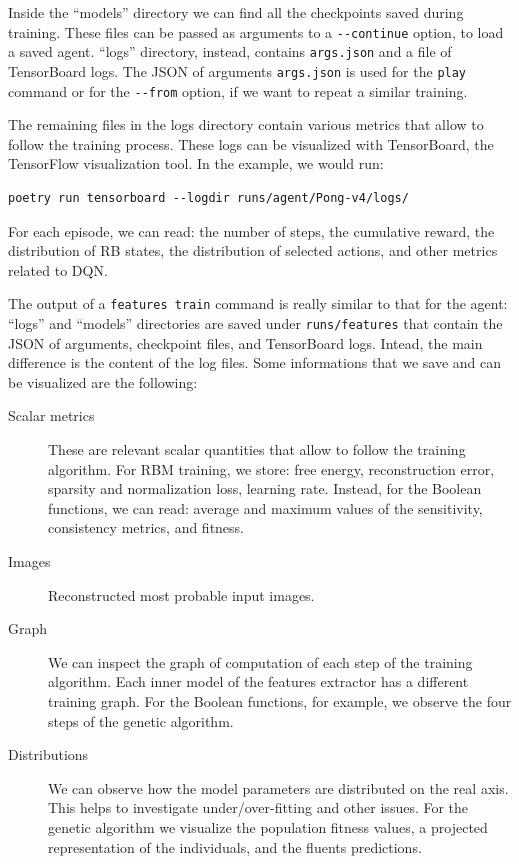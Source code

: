 Inside the ``models'' directory we can find all the checkpoints saved
during training. These files can be passed as arguments to a \verb|--continue|
option, to load a saved agent. ``logs'' directory, instead, contains
\verb|args.json| and a file of TensorBoard logs. The JSON of arguments
\verb|args.json| is used for the \texttt{play} command or for the
\verb|--from| option, if we want to repeat a similar training.

The remaining files in the logs directory contain various metrics that allow
to follow the training process. These logs can be visualized with TensorBoard,
the TensorFlow visualization tool. In the example, we would run:
\begin{verbatim}
poetry run tensorboard --logdir runs/agent/Pong-v4/logs/
\end{verbatim}
For each episode, we can read: the number of steps, the cumulative reward, the
distribution of RB states, the distribution of selected actions, and other
metrics related to DQN.

The output of a \texttt{features train} command is really similar to that for
the agent: ``logs'' and ``models'' directories are saved under
\verb|runs/features| that contain the JSON of arguments, checkpoint files, and
TensorBoard logs. Intead, the main difference is the content of the log files.
Some informations that we save and can be visualized are the following:
\begin{description}
	\item [Scalar metrics] These are relevant scalar quantities that allow to
		follow the training algorithm. For RBM training, we store: free energy,
		reconstruction error, sparsity and normalization loss, learning rate.
		Instead, for the Boolean functions, we can read: average and maximum
		values of the sensitivity, consistency metrics, and fitness.
	\item [Images] Reconstructed most probable input images.
	\item [Graph] We can inspect the graph of computation of each step of the
		training algorithm. Each inner model of the features extractor has a
		different training graph. For the Boolean functions, for example, we
		observe the four steps of the genetic algorithm.
	\item [Distributions] We can observe how the model parameters are
		distributed on the real axis. This helps to investigate under/over-fitting
		and other issues. For the genetic algorithm we visualize the population
		fitness values, a projected representation of the individuals, and the
		fluents predictions.
\end{description}



